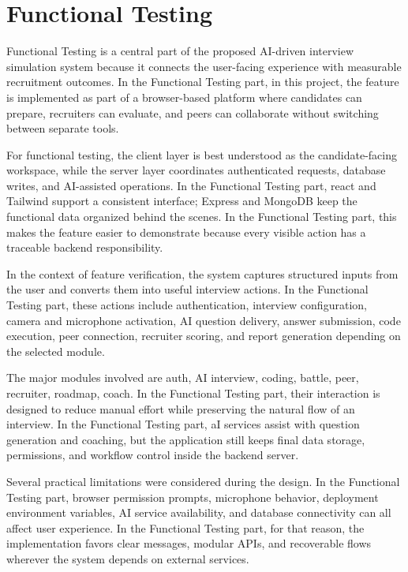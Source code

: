 \documentclass[12pt,a4paper]{report}
\begin{document}
\section{Functional Testing}

Functional Testing is a central part of the proposed AI-driven interview simulation system because it connects the user-facing experience with measurable recruitment outcomes. In the Functional Testing part, in this project, the feature is implemented as part of a browser-based platform where candidates can prepare, recruiters can evaluate, and peers can collaborate without switching between separate tools.


For functional testing, the client layer is best understood as the candidate-facing workspace, while the server layer coordinates authenticated requests, database writes, and AI-assisted operations. In the Functional Testing part, react and Tailwind support a consistent interface; Express and MongoDB keep the functional data organized behind the scenes. In the Functional Testing part, this makes the feature easier to demonstrate because every visible action has a traceable backend responsibility.


In the context of feature verification, the system captures structured inputs from the user and converts them into useful interview actions. In the Functional Testing part, these actions include authentication, interview configuration, camera and microphone activation, AI question delivery, answer submission, code execution, peer connection, recruiter scoring, and report generation depending on the selected module.


The major modules involved are auth, AI interview, coding, battle, peer, recruiter, roadmap, coach. In the Functional Testing part, their interaction is designed to reduce manual effort while preserving the natural flow of an interview. In the Functional Testing part, aI services assist with question generation and coaching, but the application still keeps final data storage, permissions, and workflow control inside the backend server.


Several practical limitations were considered during the design. In the Functional Testing part, browser permission prompts, microphone behavior, deployment environment variables, AI service availability, and database connectivity can all affect user experience. In the Functional Testing part, for that reason, the implementation favors clear messages, modular APIs, and recoverable flows wherever the system depends on external services.
\end{document}
